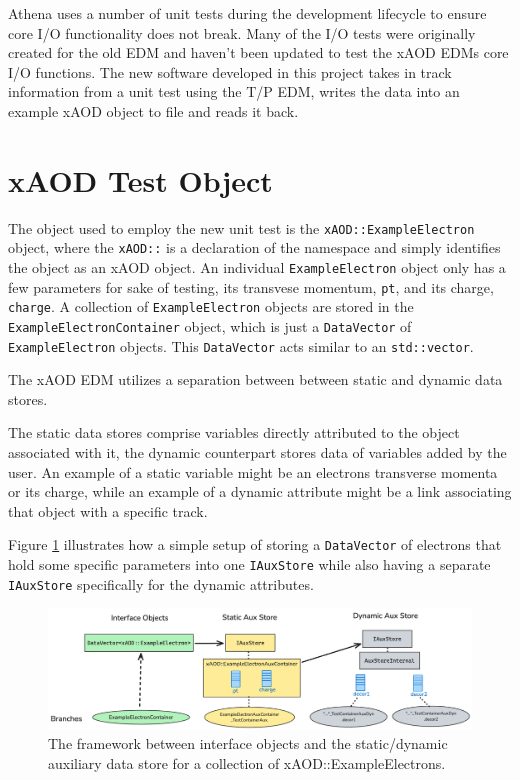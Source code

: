 Athena uses a number of unit tests during the development lifecycle to ensure core I/O functionality does not break.
Many of the I/O tests were originally created for the old EDM and haven't been updated to test the xAOD EDMs core I/O functions.
The new software developed in this project takes in track information from a unit test using the T/P EDM, writes the data into an example xAOD object to file and reads it back.


\section{xAOD Test Object}
\label{sec:Mod_utests_xAOD_object}

The object used to employ the new unit test is the \verb|xAOD::ExampleElectron| object, where the \verb|xAOD::| is a declaration of the namespace and simply identifies the object as an xAOD object.
An individual \verb|ExampleElectron| object only has a few parameters for sake of testing, its transvese momentum, \verb|pt|, and its charge, \verb|charge|.
A collection of \verb|ExampleElectron| objects are stored in the \verb|ExampleElectronContainer| object, which is just a \verb|DataVector| of \verb|ExampleElectron| objects.\cite{Buckley_2015}
This \verb|DataVector| acts similar to an \verb|std::vector|. 
 
The xAOD EDM utilizes a separation between between static and dynamic data stores.

The static data stores comprise variables directly attributed to the object associated with it, the dynamic counterpart stores data of variables added by the user.
An example of a static variable might be an electrons transverse momenta or its charge, while an example of a dynamic attribute might be a link associating that object with a specific track.  


Figure \ref{fig:Mod_utests_aux_store} illustrates how a simple setup of storing a \verb|DataVector| of electrons that hold some specific parameters into one \verb|IAuxStore| while also having a separate \verb|IAuxStore| specifically for the dynamic attributes. 

\begin{figure}[h]
    \centering
    \vspace{20px}
    \includegraphics[width=\textwidth]{content/img/aux_store_better.png}
    \caption{The framework between interface objects and the static/dynamic auxiliary data store for a collection of xAOD::ExampleElectrons.}
    \label{fig:Mod_utests_aux_store}
\end{figure}





